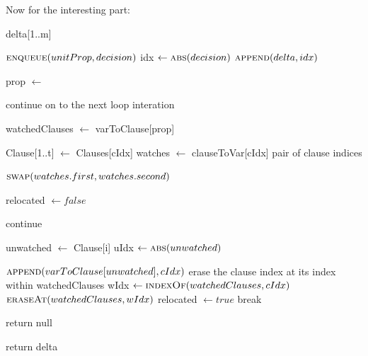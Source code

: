 Now for the interesting part:

\begin{algorithm}[H]
\caption{Watched Literal Propagation}\label{alg:19}
\begin{algorithmic}[1]

\State delta[1..m]

    \State $\Call{enqueue}{unitProp, decision}$
    \State idx $\gets \Call{abs}{decision}$
    \State $\Call{append}{delta, idx}$
\EndIf

    \State prop $\gets$ 

        \State continue on to the next loop interation
    \EndIf

    \State watchedClauses $\gets$ varToClause[prop]

        \State Clause[1..t] $\gets$ Clauses[cIdx]
        \State watches $\gets$ clauseToVar[cIdx] \Comment pair of clause indices

            \State $\Call{swap}{watches.first, watches.second}$
        \EndIf

        \State relocated $\gets false$

                \State continue
            \EndIf

            \State unwatched $\gets$ Clause[i]
            \State uIdx $\gets \Call{abs}{unwatched}$

                \State $\Call{append}{varToClause[unwatched], cIdx}$
                \State \Comment erase the clause index at its index within watchedClauses
                \State wIdx $\gets \Call{indexOf}{watchedClauses, cIdx}$ 
                \State $\Call{eraseAt}{watchedClauses, wIdx}$
                \State relocated $\gets true$
                \State break
            \EndIf
        \EndFor

                \State return null
            \EndIf
        \EndIf
    \EndFor
\EndWhile

\State return delta

\EndProcedure
\end{algorithmic}
\end{algorithm}

